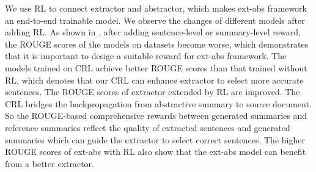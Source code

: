 We use RL to connect extractor and abstractor,
which makes ext-abs framework an end-to-end trainable model.
We observe the changes of different models after adding RL.
As shown in ,
after adding sentence-level or summary-level reward, 
the ROUGE scores of the models on datasets become worse,
which demonstrates that it is important to desige a suitable reward for ext-abs framework.
The models trained on CRL achieve better ROUGE scores than 
that trained without RL, which denotes that our CRL can enhance extractor to select more accurate sentences.
The ROUGE scores of extractor extended by RL are improved.
The CRL bridges the backpropagation from abstractive summary
to source document. So the ROUGE-based comprehensive rewards
between generated summaries and reference summaries reflect the quality of extracted sentences and generated summaries
which can guide the extractor to select correct sentences.
The higher ROUGE scores of ext-abs with RL also show
that the ext-abs model can benefit from a better extractor.
